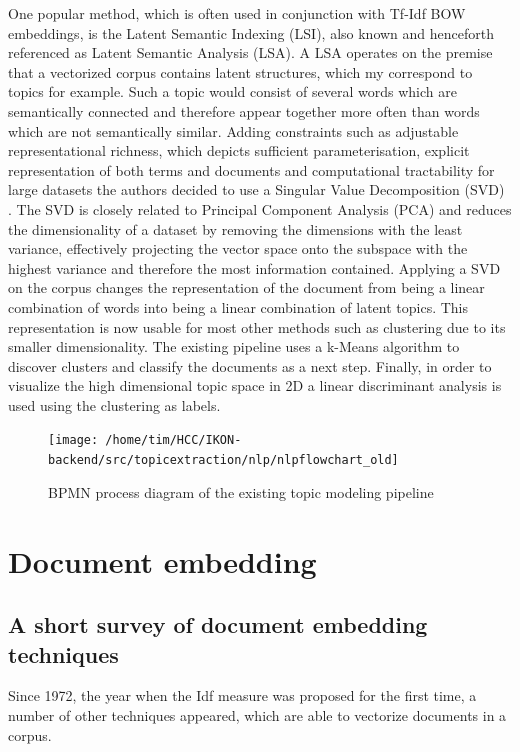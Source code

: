 One popular method, which is often used in conjunction with Tf-Idf BOW embeddings, is the Latent Semantic Indexing (LSI), also known and henceforth referenced as Latent Semantic Analysis (LSA). A LSA operates on the premise that a vectorized corpus contains latent structures, which my correspond to topics for example. Such a topic would consist of several words which are semantically connected and therefore appear together more often than words which are not semantically similar. Adding constraints such as adjustable representational richness, which depicts sufficient parameterisation, explicit representation of both terms and documents and computational tractability for large datasets the authors decided to use a Singular Value Decomposition (SVD) \cite{deerwesterIndexingLatentSemantic}. The SVD is closely related to Principal Component Analysis (PCA) and reduces the dimensionality of a dataset by removing the dimensions with the least variance, effectively projecting the vector space onto the subspace with the highest variance and therefore the most information contained. Applying a SVD on the corpus changes the representation of the document from being a linear combination of words into being a linear combination of latent topics. This representation is now usable for most other methods such as clustering due to its smaller dimensionality. The existing pipeline uses a k-Means algorithm to discover clusters and classify the documents as a next step. Finally, in order to visualize the high dimensional topic space in 2D a linear discriminant analysis is used using the clustering as labels.  



\begin{figure}[t]
	\centering
	\texttt{[image: /home/tim/HCC/IKON-backend/src/topicextraction/nlp/nlpflowchart\_old]}
	\caption{\label{pic:IKON_pipeline} BPMN process diagram of the existing topic modeling pipeline}
\end{figure}


\section{Document embedding}

\subsection{A short survey of document embedding techniques}
Since 1972, the year when the Idf measure was proposed for the first time, \cite{robertsonUnderstandingInverseDocument2004} a number of other techniques appeared, which are able to vectorize documents in a corpus.

